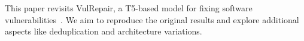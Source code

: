 This paper revisits VulRepair, a T5-based model for fixing software vulnerabilities~\cite{vulrepair}. We aim to reproduce the original results and explore additional aspects like deduplication and architecture variations.
